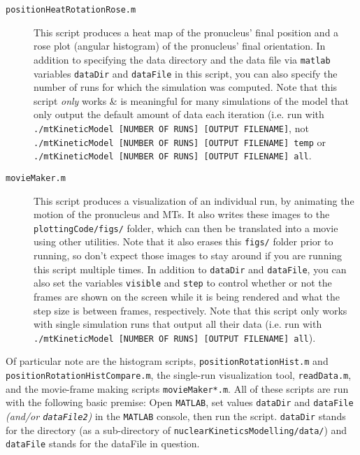 \documentclass{article}
\begin{document}
  \begin{description}
    \item[\texttt{positionHeatRotationRose.m}] This script produces a heat map
      of the pronucleus' final position and a rose plot (angular histogram) of
      the pronucleus' final orientation. In addition to specifying the data
      directory and the data file via \texttt{matlab} variables \texttt{dataDir}
      and \texttt{dataFile} in this script, you can also specify the number of
      runs for which the simulation was computed. Note that this script
      \emph{only} works \& is meaningful for many simulations of the model that
      only output the default amount of data each iteration (i.e. run with
      \texttt{./mtKineticModel [NUMBER OF RUNS] [OUTPUT FILENAME]}, not 
      \texttt{./mtKineticModel [NUMBER OF RUNS] [OUTPUT FILENAME] temp} or 
      \texttt{./mtKineticModel [NUMBER OF RUNS] [OUTPUT FILENAME] all}.
    \item[\texttt{movieMaker.m}] This script produces a visualization of an
      individual run, by animating the motion of the pronucleus and MTs. It also
      writes these images to the \texttt{plottingCode/figs/} folder, which can
      then be translated into a movie using other utilities. Note that it also
      erases this \texttt{figs/} folder prior to running, so don't expect those
      images to stay around if you are running this script multiple times. In
      addition to \texttt{dataDir} and \texttt{dataFile}, you can also set the
      variables \texttt{visible} and \texttt{step} to control whether or not the
      frames are shown on the screen while it is being rendered and what the
      step size is between frames, respectively. Note that this script only
      works with single simulation runs that output all their data (i.e. run
      with \texttt{./mtKineticModel [NUMBER OF RUNS] [OUTPUT FILENAME] all}).
  \end{description}
  
  
  
  Of particular note are
  the histogram scripts, \texttt{positionRotationHist.m} and
  \texttt{positionRotationHistCompare.m}, the single-run visualization tool,
  \texttt{readData.m}, and the movie-frame making scripts
  \texttt{movieMaker*.m}. All of these scripts are run with the following basic
  premise: Open \texttt{MATLAB}, set values \texttt{dataDir} and
  \texttt{dataFile} \textit{(and/or \texttt{dataFile2})} in the \texttt{MATLAB}
  console, then run the script. \texttt{dataDir} stands for the directory (as a
  sub-directory of \texttt{nuclearKineticsModelling/data/}) and
  \texttt{dataFile} stands for the dataFile in question. 
\end{document}
